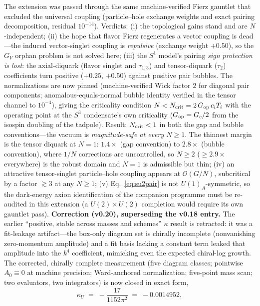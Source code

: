 \documentclass[11pt,a4paper]{article}
\begin{document}
The extension was passed through the same machine-verified Fierz
gauntlet that excluded the universal coupling (particle--hole
exchange weights and exact pairing decomposition, residual
$10^{-14}$).  Verdicts:
(i) the topological gains stand and are $N$-independent;
(ii) the hope that flavor Fierz regenerates a vector coupling is
dead---the induced vector-singlet coupling is \emph{repulsive}
(exchange weight $+0.50$), so the $G_V$ orphan problem is not
solved here;
(iii) the $S^1$ model's pairing \emph{sign protection is lost}:
the axial-diquark (flavor singlet and $\tau_{1,3}$) and
tensor-diquark ($\tau_2$) coefficients turn positive
($+0.25$, $+0.50$) against positive pair bubbles.  The
normalizations are now pinned (machine-verified Wick factor $2$
for diagonal pair components; anomalous-equals-normal bubble
identity verified in the tensor channel to $10^{-4}$), giving the
criticality condition $N < N_{\rm crit} = 2\,G_{\rm op}\,c_i
T_i$ with the operating point at the $S^3$ condensate's own
criticality ($G_{\rm op} = G_c/2$ from the isospin doubling of
the tadpole).  Result: $N_{\rm crit} < 1$ in both the gap and
bubble conventions---the vacuum is \emph{magnitude-safe at every
$N \geq 1$}.  The thinnest margin is the tensor diquark at
$N = 1$: $1.4\times$ (gap convention) to $2.8\times$ (bubble
convention), where $1/N$ corrections are uncontrolled, so
$N \geq 2$ ($\geq 2.9\times$ everywhere) is the robust domain
and $N = 1$ is admissible but thin;
(iv) an attractive tensor-singlet particle--hole coupling appears
at $\mathcal{O}(G/N)$, subcritical by a factor $\gtrsim 3$ at any
$N \geq 1$;
(v) Eq.~\eqref{eq:su2pair} is not $U(1)_A$-symmetric, so the
dark-energy axion identification of the companion programme must
be re-audited in this extension (a $U(2)\times U(2)$ completion
would require its own gauntlet pass).
\textbf{Correction (v0.20), superseding the v0.18 entry.}  The
earlier ``positive, stable across masses and schemes''
$\kappa$ result is retracted: it was a fit-leakage artifact---the
box-only diagram set is chirally incomplete (nonvanishing
zero-momentum amplitude) and a fit basis lacking a constant term
leaked that amplitude into the $k^4$ coefficient, mimicking even
the expected chiral-log growth.  The corrected, chirally complete
measurement (five diagram classes; pointwise $A_0 \equiv 0$ at
machine precision; Ward-anchored normalization; five-point mass
scan; two evaluators, two integrators) is now closed in exact
form,
\begin{equation}
\kappa_U \;=\; -\frac{17}{1152\pi^2} \;=\; -0.0014952,
\end{equation}
\end{document}
